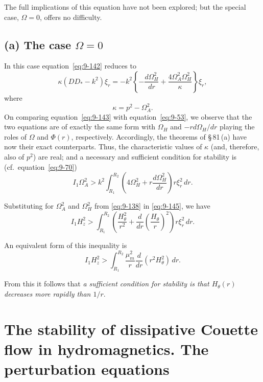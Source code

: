 The full implications of this equation have not been explored; but the special case, $\Omega = 0$, offers no difficulty.

\subsection*{(a) The case $\Omega = 0$}

In this case equation~\eqref{eq:9-142} reduces to
\begin{equation}
\kappa(DD_* - k^2)\xi_r = -k^2 \left\{-\frac{d\Omega_H^2}{dr} + \frac{4\Omega_A^2\Omega_H^2}{\kappa}\right\}\xi_r, \label{eq:9-143}
\end{equation}
where
\begin{equation}
\kappa = p^2 - \Omega_A^2. \label{eq:9-144}
\end{equation}
On comparing equation~\eqref{eq:9-143} with equation~\eqref{eq:9-53}, we observe that the two equations are of exactly the same form with $\Omega_H$ and $-rd\Omega_H/dr$ playing the roles of $\Omega$ and $\Phi(r)$, respectively. Accordingly, the theorems of \S\,81\,(a) have now their exact counterparts. Thus, the characteristic values of $\kappa$ (and, therefore, also of $p^2$) are real; and a necessary and sufficient condition for stability is (cf.\ equation~\eqref{eq:9-70})
\begin{equation}
I_1 \Omega_A^2 > k^2 \int_{R_1}^{R_2} \left(4\Omega_H^2 + r\frac{d\Omega_H^2}{dr}\right) r\xi_r^2\, dr. \label{eq:9-145}
\end{equation}

Substituting for $\Omega_A^2$ and $\Omega_H^2$ from \eqref{eq:9-138} in \eqref{eq:9-145}, we have
\begin{equation}
I_1 H_z^2 > \int_{R_1}^{R_2} \left(\frac{H_\theta^2}{r^2} + \frac{d}{dr}\!\left(\frac{H_\theta}{r}\right)^2\right) r\xi_r^2\, dr. \label{eq:9-146}
\end{equation}

An equivalent form of this inequality is
\begin{equation}
I_1 H_z^2 > \int_{R_1}^{R_2} \frac{\mu^2_m}{r}\frac{d}{dr}(r^2 H_\theta^2)\, dr. \label{eq:9-147}
\end{equation}

From this it follows that \emph{a sufficient condition for stability is that $H_\theta(r)$ decreases more rapidly than $1/r$}.

\section{The stability of dissipative Couette flow in hydromagnetics. The perturbation equations}
\label{sec:85}

